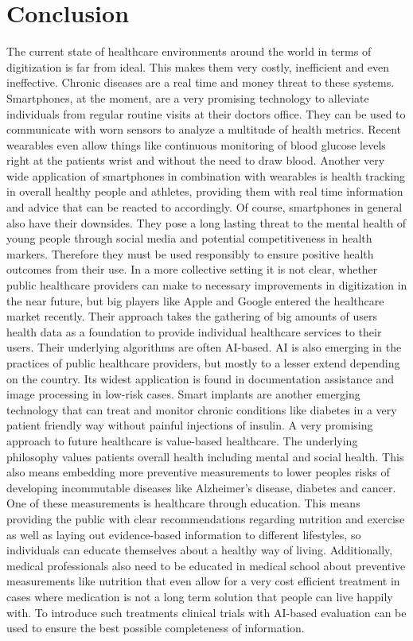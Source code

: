 \section{Conclusion}%
\label{sec:conclusion}

The current state of healthcare environments around the world in terms of digitization is far from ideal. This makes them very costly, inefficient and even ineffective. Chronic diseases are a real time and money threat to these systems. Smartphones, at the moment, are a very promising technology to alleviate individuals from regular routine visits at their doctors office. They can be used to communicate with worn sensors to analyze a multitude of health metrics. Recent wearables even allow things like continuous monitoring of blood glucose levels right at the patients wrist and without the need to draw blood. Another very wide application of smartphones in combination with wearables is health tracking in overall healthy people and athletes, providing them with real time information and advice that can be reacted to accordingly. Of course, smartphones in general also have their downsides. They pose a long lasting threat to the mental health of young people through social media and potential competitiveness in health markers. Therefore they must be used responsibly to ensure positive health outcomes from their use. In a more collective setting it is not clear, whether public healthcare providers can make to necessary improvements in digitization in the near future, but big players like Apple and Google entered the healthcare market recently. Their approach takes the gathering of big amounts of users health data as a foundation to provide individual healthcare services to their users. Their underlying algorithms are often AI-based. AI is also emerging in the practices of public healthcare providers, but mostly to a lesser extend depending on the country. Its widest application is found in documentation assistance and image processing in low-risk cases. Smart implants are another emerging technology that can treat and monitor chronic conditions like diabetes in a very patient friendly way without painful injections of insulin. A very promising approach to future healthcare is value-based healthcare. The underlying philosophy values patients overall health including mental and social health. This also means embedding more preventive measurements to lower peoples risks of developing incommutable diseases like Alzheimer's disease, diabetes and cancer. One of these measurements is healthcare through education. This means providing the public with clear recommendations regarding nutrition and exercise as well as laying out evidence-based information to different lifestyles, so individuals can educate themselves about a healthy way of living. Additionally, medical professionals also need to be educated in medical school about preventive measurements like nutrition that even allow for a very cost efficient treatment in cases where medication is not a long term solution that people can live happily with. To introduce such treatments clinical trials with AI-based evaluation can be used to ensure the best possible completeness of information.
